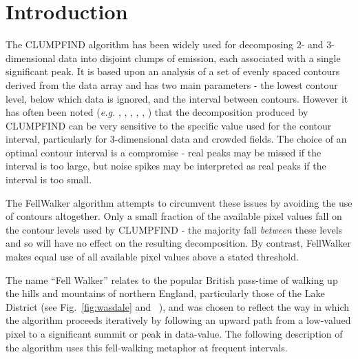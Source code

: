 \documentclass[final,authoryear,5p,times,twocolumn]{elsarticle}
\begin{document}

\newcommand{\mnras}{Mon Not R Astron Soc}
\newcommand{\aap}{Astron Astrophys}
\newcommand{\aaps}{Astron Astrophys Supp}
\newcommand{\pasp}{Pub Astron Soc Pacific}
\newcommand{\apj}{Astrophys J}
\newcommand{\apjs}{Astrophys J Supp}
\newcommand{\qjras}{Quart J R Astron Soc}
\newcommand{\an}{Astron.\ Nach.}
\newcommand{\ijimw}{Int.\ J.\ Infrared \& Millimeter Waves}
\newcommand{\procspie}{Proc.\ SPIE}
\newcommand{\aspconf}{ASP Conf. Ser.}

\newcommand{\ascl}[1]{\href{http://www.ascl.net/#1}{ascl:#1}}

\section{Introduction}
\label{sec:intro}

The CLUMPFIND algorithm \citep[][\ascl{1107.014}]{1994Williams} has been
widely used for decomposing 2- and 3-dimensional data into disjoint
clumps of emission, each associated with a single significant peak. It is
based upon an analysis of a set of evenly spaced contours derived from
the data array and has two main parameters - the lowest contour level,
below which data is ignored, and the interval between contours. However
it has often been noted (\emph{e.g.} \cite{2014Christie},
\cite{2009Kainulainen}, \cite{2009Pineda}, \cite{2008Smith}, \cite{2007Elia},
\cite{2003Brunt}) that the decomposition produced by CLUMPFIND can be very
sensitive to the specific value used for the contour interval, particularly
for 3-dimensional data and crowded fields. The choice of an optimal contour
interval is a compromise - real peaks may be missed if the interval is too
large, but noise spikes may be interpreted as real peaks if the interval is
too small.

The FellWalker algorithm attempts to circumvent these issues by avoiding
the use of contours altogether. Only a small fraction of the available
pixel values fall on the contour levels used by CLUMPFIND - the majority
fall \emph{between} these levels and so will have no effect on the
resulting decomposition. By contrast, FellWalker makes equal use of all
available pixel values above a stated threshold.

The name ``Fell Walker'' relates to the popular British pass-time of
walking up the hills and mountains of northern England, particularly
those of the Lake District (see Fig.~\ref{fig:wasdale} and
~), and was
chosen to reflect the way in which the algorithm proceeds iteratively by
following an upward path from a low-valued pixel to a significant summit
or peak in data-value. The following description of the algorithm uses
this fell-walking metaphor at frequent intervals.
\end{document}

